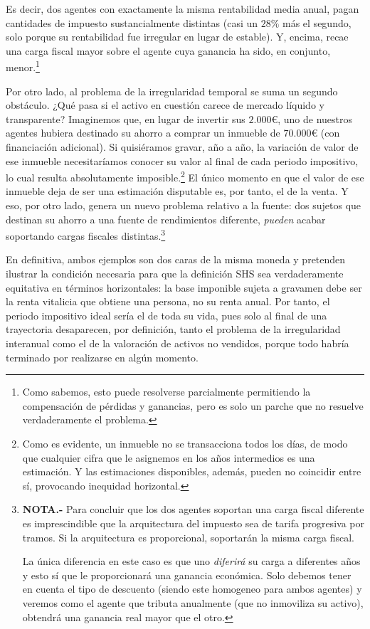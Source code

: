 \documentclass[10pt,a4paper]{article}
\begin{document}
Es decir, dos agentes con exactamente la misma rentabilidad media anual, pagan cantidades de impuesto sustancialmente distintas (casi un $28\%$ más el segundo, solo porque su rentabilidad fue irregular en lugar de estable). Y, encima, recae una carga fiscal mayor sobre el agente cuya ganancia ha sido, en conjunto, menor.\footnote{%
    Como sabemos, esto puede resolverse parcialmente permitiendo la compensación de pérdidas y ganancias, pero es solo un parche que no resuelve verdaderamente el problema.
}

Por otro lado, al problema de la irregularidad temporal se suma un segundo obstáculo. ¿Qué pasa si el activo en cuestión carece de mercado líquido y transparente? Imaginemos que, en lugar de invertir sus $2.000€$, uno de nuestros agentes hubiera destinado su ahorro a comprar un inmueble de $70.000€$ (con financiación adicional). Si quisiéramos gravar, año a año, la variación de valor de ese inmueble necesitaríamos conocer su valor al final de cada periodo impositivo, lo cual resulta absolutamente imposible.\footnote{%
    Como es evidente, un inmueble no se transacciona todos los días, de modo que cualquier cifra que le asignemos en los años intermedios es una estimación. Y las estimaciones disponibles, además, pueden no coincidir entre sí, provocando inequidad horizontal.
} El único momento en que el valor de ese inmueble deja de ser una estimación disputable es, por tanto, el de la venta. Y eso, por otro lado, genera un nuevo problema relativo a la fuente: dos sujetos que destinan su ahorro a una fuente de rendimientos diferente, \textit{pueden} acabar soportando cargas fiscales distintas.\footnote{%
    \textbf{NOTA.-} Para concluir que los dos agentes soportan una carga fiscal diferente es imprescindible que la arquitectura del impuesto sea de tarifa progresiva por tramos. Si la arquitectura es proporcional, soportarán la misma carga fiscal. 

La única diferencia en este caso es que uno \textit{diferirá} su carga a diferentes años y esto sí que le proporcionará una ganancia económica. Solo debemos tener en cuenta el tipo de descuento (siendo este homogeneo para ambos agentes) y veremos como el agente que tributa anualmente (que no inmoviliza su activo), obtendrá una ganancia real mayor que el otro.
} 

En definitiva, ambos ejemplos son dos caras de la misma moneda y pretenden ilustrar la condición necesaria para que la definición SHS sea verdaderamente equitativa en términos horizontales: la base imponible sujeta a gravamen debe ser la renta vitalicia que obtiene una persona, no su renta anual. Por tanto, el periodo impositivo ideal sería el de toda su vida, pues solo al final de una trayectoria desaparecen, por definición, tanto el problema de la irregularidad interanual como el de la valoración de activos no vendidos, porque todo habría terminado por realizarse en algún momento. 
\end{document}
